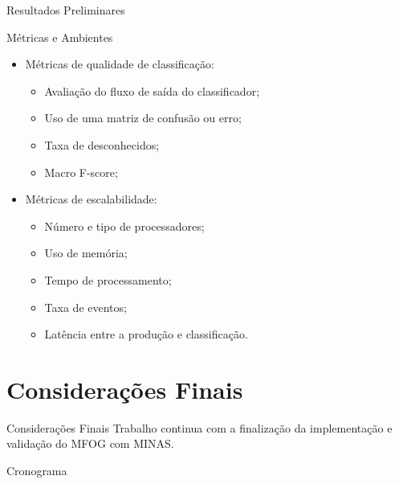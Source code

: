 \documentclass[aspectratio=43,10pt]{beamer}
\begin{document}
\begin{frame}[fragile]{Resultados Preliminares}
  \begin{alertblock}{Métricas e Ambientes}
    \begin{itemize}
      \item Métricas de qualidade de classificação:
      \begin{itemize}
        \item Avaliação do fluxo de saída do classificador;
        \item Uso de uma matriz de confusão ou erro;
        \item Taxa de desconhecidos;
        \item Macro F-score;
      \end{itemize}
      \item Métricas de escalabilidade:
      \begin{itemize}
        \item Número e tipo de processadores;
        \item Uso de memória;
        \item Tempo de processamento;
        \item Taxa de eventos;
        \item Latência entre a produção e classificação.
      \end{itemize}
    \end{itemize}
  \end{alertblock}
\end{frame}

\section{Considerações Finais}
\begin{frame}{Considerações Finais}
Trabalho continua com a finalização da implementação e validação do MFOG com MINAS.
\end{frame}

\begin{frame}{Cronograma}
\end{frame}
\end{document}
